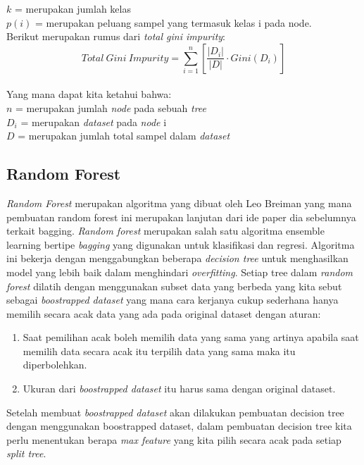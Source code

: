 $k$ = merupakan jumlah kelas\\
$p(i)$ = merupakan peluang sampel yang termasuk kelas i pada node.\\
Berikut merupakan rumus dari \textit{total gini impurity}:\\ 
\begin{equation}
Total \ Gini \ Impurity = \sum_{i=1}^n \left[\frac{|D_i|}{|D|} \cdot Gini(D_i)\right]
\end{equation}
\label{eq:2.totalgini}
\\
Yang mana dapat kita ketahui bahwa:\\
$n$ = merupakan jumlah \textit{node} pada sebuah \textit{tree}\\
$D_i$ = merupakan \textit{dataset} pada \textit{node} i\\
$D$ = merupakan  jumlah total sampel dalam \textit{dataset}\\

\subsection{Random Forest} \label{II.randomforest}
\textit{Random Forest} merupakan algoritma yang dibuat oleh Leo Breiman  yang mana pembuatan random forest ini merupakan lanjutan dari ide paper dia sebelumnya terkait bagging\cite{breiman2001random,breiman1996bagging}.
\textit{Random forest} merupakan salah satu algoritma ensemble learning bertipe \textit{bagging} yang digunakan untuk klasifikasi dan regresi. Algoritma ini bekerja dengan menggabungkan beberapa \textit{decision tree} untuk menghasilkan model yang lebih baik dalam menghindari \textit{overfitting}\cite{breiman2001random}. Setiap tree dalam \textit{random forest} dilatih dengan menggunakan subset data yang berbeda yang kita sebut sebagai \textit{boostrapped dataset} yang mana cara kerjanya cukup sederhana hanya memilih secara acak data yang ada pada original dataset dengan aturan:
\begin{enumerate}[noitemsep]
    \item Saat pemilihan acak boleh memilih data yang sama yang artinya apabila saat memilih data secara acak itu terpilih data yang sama maka itu diperbolehkan.
    \item Ukuran dari \textit{boostrapped dataset} itu harus sama dengan original dataset.
\end{enumerate}
Setelah membuat \textit{boostrapped dataset} akan dilakukan pembuatan decision tree dengan menggunakan boostrapped dataset, dalam pembuatan decision tree kita perlu menentukan berapa \textit{max feature} yang kita pilih secara acak pada setiap \textit{split tree}.

